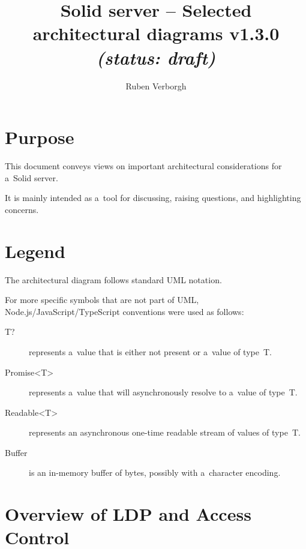 \documentclass[10pt]{article}
\title{
  Solid server -- Selected architectural diagrams v1.3.0
  \it (status: draft)
}
\author{Ruben Verborgh}
\begin{document}
\maketitle


\section*{Purpose}
This document conveys views
on important architectural considerations for a~Solid server.

It is mainly intended as a~tool for discussing,
raising questions,
and highlighting concerns.


\section*{Legend}
The architectural diagram follows standard UML notation.

For more specific symbols that are not part of UML,
Node.js/JavaScript/TypeScript conventions were used as follows:

\begin{description}
  \item[T?] represents a~value that is either not present
            or a~value of type~T.
  \item[Promise<T>] represents a~value that will asynchronously resolve
                    to a~value of type~T.
  \item[Readable<T>] represents an asynchronous one-time readable stream
                     of values of type~T.
  \item[Buffer] is an in-memory buffer of bytes,
                possibly with a~character encoding.
\end{description}

\section*{Overview of LDP and Access Control}

\newcommand\ResourceStoreBody{%
  + getRepresentation(ResourceIdentifier, RepresentationPreferences, Conditions?) : Promise<Representation>\\
  + addResource(container : ResourceIdentifier, Representation, Conditions?) : Promise<ResourceIdentifier>\\
  + setRepresentation(ResourceIdentifier, Representation, Conditions?) : Promise<void>\\
  + deleteResource(ResourceIdentifier, Conditions?) : Promise<void>\\
  + modifyResource(ResourceIdentifier, Patch, Conditions?) : Promise<void>\\
}
\end{document}
